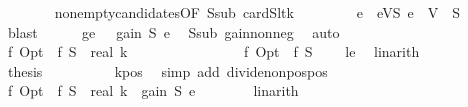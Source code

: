 \begin{isabellebody}
\ \ \ \ \ \ \isamarkupfalse%
\ nonempty{\isacharunderscore}{\kern0pt}candidates{\isacharbrackleft}{\kern0pt}OF\ S{\isacharunderscore}{\kern0pt}sub\ cardS{\isacharunderscore}{\kern0pt}lt{\isacharunderscore}{\kern0pt}k{\isacharbrackright}{\kern0pt}\ \isakeywordONE{{\isachardot}{\kern0pt}}\isamarkupfalse%
\isanewline
\isanewline
\ \ \ \ \isamarkupfalse%
\ \isamarkupfalse%
\ e\ \ eVS{\isacharcolon}{\kern0pt}\ {\isachardoublequoteopen}e\ {\isasymin}\ V\ {\isacharminus}{\kern0pt}\ S{\isachardoublequoteclose}\ \isamarkupfalse%
\ blast\isanewline
\ \ \ \ \isamarkupfalse%
\ ge{}{\isacharcolon}{\kern0pt}\ {\isachardoublequoteopen}{}\ {\isasymle}\ gain\ S\ e{\isachardoublequoteclose}\ \isamarkupfalse%
\ S{\isacharunderscore}{\kern0pt}sub\ gain{\isacharunderscore}{\kern0pt}nonneg\ \isamarkupfalse%
\ auto\isanewline
\isanewline
\ \ \ \ \isamarkupfalse%
\ \isamarkupfalse%
\ {\isachardoublequoteopen}{\isacharparenleft}{\kern0pt}f\ Opt\ {\isacharminus}{\kern0pt}\ f\ S{\isacharparenright}{\kern0pt}\ {\isacharslash}{\kern0pt}\ real\ k\ {\isasymle}\ {}{\isachardoublequoteclose}\isanewline
\ \ \ \ \isamarkupfalse%
\ {\isacharminus}{\kern0pt}\isanewline
\ \ \ \ \ \ \isamarkupfalse%
\ {\isachardoublequoteopen}f\ Opt\ {\isacharminus}{\kern0pt}\ f\ S\ {\isasymle}\ {}{\isachardoublequoteclose}\ \isamarkupfalse%
\ le\ \isamarkupfalse%
\ linarith\isanewline
\ \ \ \ \ \ \isamarkupfalse%
\ {\isacharquery}{\kern0pt}thesis\isanewline
\ \ \ \ \ \ \ \ \isamarkupfalse%
\ k{\isacharunderscore}{\kern0pt}pos\ \isamarkupfalse%
\ {\isacharparenleft}{\kern0pt}simp\ add{\isacharcolon}{\kern0pt}\ divide{\isacharunderscore}{\kern0pt}nonpos{\isacharunderscore}{\kern0pt}pos{\isacharparenright}{\kern0pt}\isanewline
\ \ \ \ \isamarkupfalse%
\isanewline
\isanewline
\ \ \ \ \isamarkupfalse%
\ \isamarkupfalse%
\ {\isachardoublequoteopen}{\isacharparenleft}{\kern0pt}f\ Opt\ {\isacharminus}{\kern0pt}\ f\ S{\isacharparenright}{\kern0pt}\ {\isacharslash}{\kern0pt}\ real\ k\ {\isasymle}\ gain\ S\ e{\isachardoublequoteclose}\isanewline
\ \ \ \ \ \ \isamarkupfalse%
\ linarith\isanewline
\isanewline
\ \ \ \ \isamarkupfalse%

\end{isabellebody}
